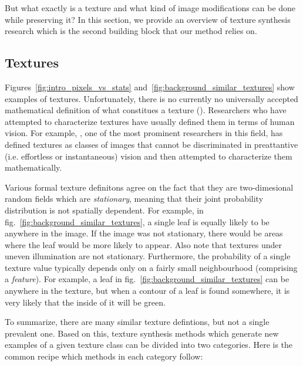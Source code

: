 But what exactly is a texture and what kind of image modifications can be done while preserving it? In this section, we provide an overview of texture synthesis research which is the second building block that our method relies on.

\subsection{Textures}
\label{section:background-texture_synthesis-textures}

Figures~\ref{fig:intro_pixels_vs_stats} and~\ref{fig:background_similar_textures} show examples of textures. Unfortunately, there is no currently no universally accepted mathematical definition of what constitues a texture (\citet{Raad2018}). Researchers who have attempted to characterize textures have usually defined them in terms of human vision. For example, \citet{Julesz1962}, one of the most prominent researchers in this field, has defined textures as classes of images that cannot be discriminated in preattantive (i.e. effortless or instantaneous) vision and then attempted to characterize them mathematically.

Various formal texture definitons agree on the fact that they are two-dimesional random fields which are \textit{stationary}, meaning that their joint probability distribution is not spatially dependent. For example, in fig.~\ref{fig:background_similar_textures}, a single leaf is equally likely to be anywhere in the image. If the image was not stationary, there would be areas where the leaf would be more likely to appear. Also note that textures under uneven illumination are not stationary. Furthermore, the probability of a single texture value typically depends only on a fairly small neighbourhood (comprising a \textit{feature}). For example, a leaf in fig.~\ref{fig:background_similar_textures} can be anywhere in the texture, but when a contour of a leaf is found somewhere, it is very likely that the inside of it will be green. 

To summarize, there are many similar texture defintions, but not a single prevalent one. Based on this, texture synthesis methods which generate new examples of a given texture class can be divided into two categories. Here is the common recipe which methods in each category follow:

